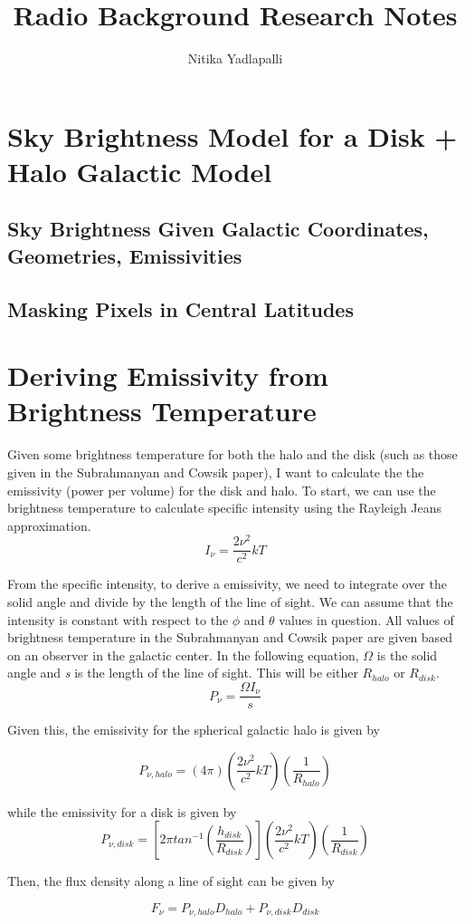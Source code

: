 \documentclass[letterpaper, 10pt]{article}
\title{Radio Background Research Notes}
\author{Nitika Yadlapalli}
\date{}
\begin{document}
\maketitle

\section{Sky Brightness Model for a Disk + Halo Galactic Model}

\subsection{Sky Brightness Given Galactic Coordinates, Geometries, Emissivities}



\subsection{Masking Pixels in Central Latitudes}

\section{Deriving Emissivity from Brightness Temperature}
Given some brightness temperature for both the halo and the disk (such as those given in the Subrahmanyan and Cowsik paper), I want to calculate the the emissivity (power per volume) for the disk and halo. To start, we can use the brightness temperature to calculate specific intensity using the Rayleigh Jeans approximation. 
\[ I_{\nu} = \frac{2\nu^{2}}{c^{2}}kT \]

From the specific intensity, to derive a emissivity, we need to integrate over the solid angle and divide by the length of the line of sight. We can assume that the intensity is constant with respect to the $\phi$ and $\theta$ values in question. All values of brightness temperature in the Subrahmanyan and Cowsik paper are given based on an observer in the galactic center. In the following equation, $\Omega$ is the solid angle and \emph{s} is the length of the line of sight. This will be either $R_{halo}$ or $R_{disk}$.
\[ P_{\nu} = \frac{\Omega I_{\nu}}{s} \]

Given this, the emissivity for the spherical galactic halo is given by 

\[P_{\nu, halo} = (4\pi)\left(\frac{2\nu^{2}}{c^{2}}kT\right)\left(\frac{1}{R_{halo}}\right)\]

while the emissivity for a disk is given by 
\[P_{\nu, disk} = \left[ 2\pi tan^{-1}\left(\frac{h_{disk}}{R_{disk}}\right) \right]\left(\frac{2\nu^{2}}{c^{2}}kT\right)\left(\frac{1}{R_{disk}}\right)\]

Then, the flux density along a line of sight can be given by 

\[F_{\nu} = P_{\nu, halo}D_{halo} + P_{\nu, disk}D_{disk} \]
\end{document}
